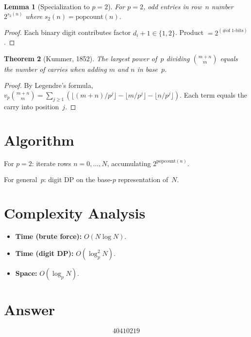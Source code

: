 \documentclass[11pt]{article}
\newtheorem{theorem}{Theorem}
\newtheorem{lemma}[theorem]{Lemma}
\theoremstyle{definition}
\begin{document}
\begin{lemma}[Specialization to $p=2$]
For $p=2$, odd entries in row~$n$ number $2^{s_2(n)}$ where $s_2(n) = \mathrm{popcount}(n)$.
\end{lemma}

\begin{proof}
Each binary digit contributes factor $d_i+1 \in \{1,2\}$. Product $= 2^{(\#\text{of 1-bits})}$.
\end{proof}

\begin{theorem}[Kummer, 1852]
The largest power of~$p$ dividing $\binom{m+n}{m}$ equals the number of carries when adding $m$ and $n$ in base~$p$.
\end{theorem}

\begin{proof}
By Legendre's formula, $v_p\binom{m+n}{m} = \sum_{j \geq 1}\!\left(\lfloor(m{+}n)/p^j\rfloor - \lfloor m/p^j\rfloor - \lfloor n/p^j\rfloor\right)$. Each term equals the carry into position~$j$.
\end{proof}

\section{Algorithm}

For $p=2$: iterate rows $n = 0,\ldots,N$, accumulating $2^{\mathrm{popcount}(n)}$.

For general~$p$: digit DP on the base-$p$ representation of~$N$.

\section{Complexity Analysis}

\begin{itemize}
    \item \textbf{Time (brute force):} $O(N \log N)$.
    \item \textbf{Time (digit DP):} $O(\log_p^2 N)$.
    \item \textbf{Space:} $O(\log_p N)$.
\end{itemize}

\section{Answer}

\[
\boxed{40410219}
\]
\end{document}
